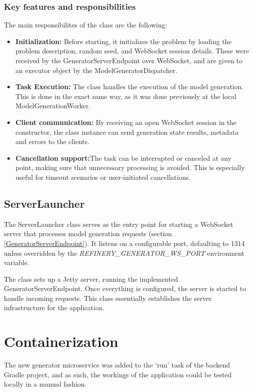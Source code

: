 		\subsubsection{Key features and responsibilities}\label{Key features and responsibilites}
			The main responsibilites of the class are the following:
			\begin{itemize}
				\item \textbf{Initialization:} Before starting, it initializes the problem by loading the problem description, random seed, and WebSocket session details. These were
				received by the GeneratorServerEndpoint over WebSocket, and are given to an executor object by the ModelGeneratorDispatcher.
				\item \textbf{Task Execution:} The class handles the execution of the model generation. This is done in the exact same way, as it was done previously at the local ModelGenerationWorker.
				\item \textbf{Client communication:} By receiving an open WebSocket session in the constructor, the class instance can send generation 
				state results, metadata and errors to the clients.
				\item \label{serverexecutorcancel}\textbf{Cancellation support:}The task can be interrupted or canceled at any point, 
				making sure that unnecessary processing is avoided. This is especially useful for timeout scenarios or user-initiated cancellations.
			\end{itemize}

		\subsection{ServerLauncher}\label{Serverlauncher}
		The ServerLauncher class serves as the entry point for starting a WebSocket server that 
		processes model generation requests (section \ref{GeneratorServerEndpoint}). It listens on a configurable port, defaulting to 1314 
		unless overridden by the \textit{REFINERY\_GENERATOR\_WS\_PORT} environment variable. 
		
		The class sets up a Jetty server, running the implemented GeneratorServerEndpoint.
		Once everything is configured, the server is started to handle incoming requests. 
		This class essentially establishes the server infrastructure for the application.

	\section{Containerization}\label{Containerization}
		The new generator microservice was added 
		to the `run' task of the backend Gradle project, and as such, the workings of the application could be tested locally in a manual fashion. 
		
